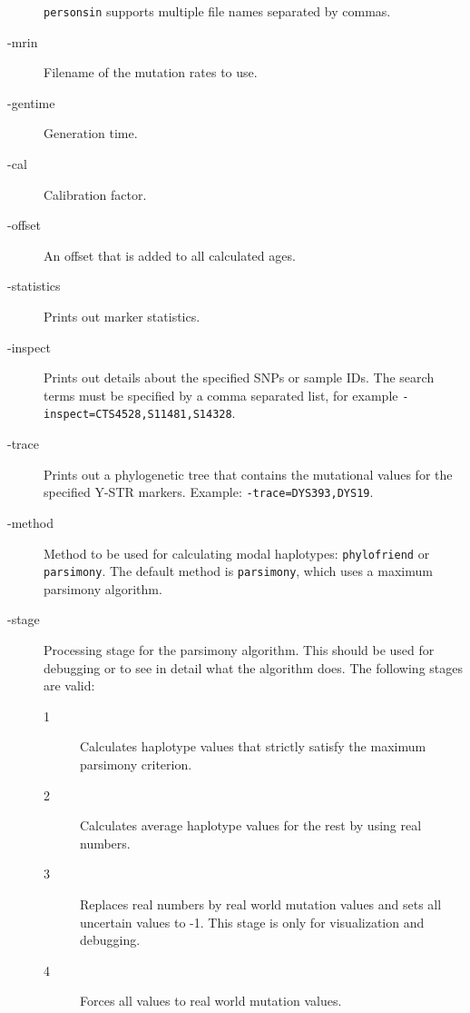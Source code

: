 \begin{description}
	\texttt{personsin} supports multiple file names separated by
	commas.
\item[-mrin] Filename of the mutation rates to use.
\item[-gentime] Generation time.
\item[-cal] Calibration factor.
\item[-offset] An offset that is added to all calculated ages.
\item[-statistics] Prints out marker statistics.
\item[-inspect] Prints out details about the specified SNPs or
	sample IDs. The search terms must be specified by a comma
	separated list, for example \texttt{-inspect=CTS4528,S11481,S14328}.
\item[-trace] Prints out a phylogenetic tree that contains the
	mutational values for the specified Y-STR markers. Example:
	\texttt{-trace=DYS393,DYS19}.
\item[-method] Method to be used for calculating modal haplotypes:
	\texttt{phylofriend} or \texttt{parsimony}. The default method
	is \texttt{parsimony}, which uses a maximum parsimony algorithm.
\item[-stage] Processing stage for the parsimony algorithm. This
	should be used for debugging or to see in detail what the algorithm
	does. The following stages are valid:
	\begin{description}
	\item[1] Calculates haplotype values that strictly satisfy
		the maximum parsimony criterion.
	\item[2] Calculates average haplotype values for the rest
		by using real numbers.
	\item[3] Replaces real numbers by real world mutation values
		and sets all uncertain values to -1.
		This stage is only for visualization and debugging.
	\item[4] Forces all values to real world mutation values.
	\end{description}
\end{description}

